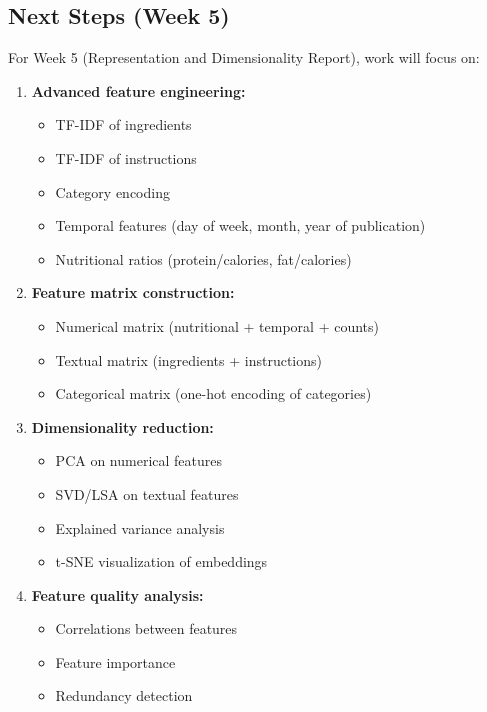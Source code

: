 \documentclass[11pt,a4paper]{article}
\begin{document}
\subsection{Next Steps (Week 5)}

For Week 5 (Representation and Dimensionality Report), work will focus on:

\begin{enumerate}
    \item \textbf{Advanced feature engineering:}
    \begin{itemize}
        \item TF-IDF of ingredients
        \item TF-IDF of instructions
        \item Category encoding
        \item Temporal features (day of week, month, year of publication)
        \item Nutritional ratios (protein/calories, fat/calories)
    \end{itemize}

    \item \textbf{Feature matrix construction:}
    \begin{itemize}
        \item Numerical matrix (nutritional + temporal + counts)
        \item Textual matrix (ingredients + instructions)
        \item Categorical matrix (one-hot encoding of categories)
    \end{itemize}

    \item \textbf{Dimensionality reduction:}
    \begin{itemize}
        \item PCA on numerical features
        \item SVD/LSA on textual features
        \item Explained variance analysis
        \item t-SNE visualization of embeddings
    \end{itemize}

    \item \textbf{Feature quality analysis:}
    \begin{itemize}
        \item Correlations between features
        \item Feature importance
        \item Redundancy detection
    \end{itemize}
\end{enumerate}
\end{document}
